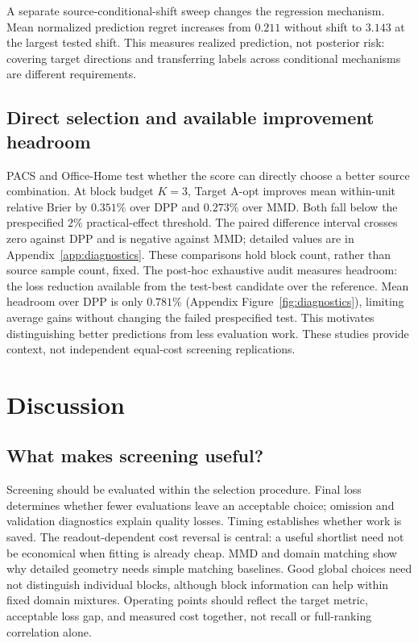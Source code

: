 A separate source-conditional-shift sweep changes the regression mechanism. Mean normalized prediction regret increases from $0.211$ without shift to $3.143$ at the largest tested shift. This measures realized prediction, not posterior risk: covering target directions and transferring labels across conditional mechanisms are different requirements.

\subsection{Direct selection and available improvement headroom}
PACS and Office-Home test whether the score can directly choose a better source combination. At block budget $K=3$, Target A-opt improves mean within-unit relative Brier by $0.351\%$ over DPP and $0.273\%$ over MMD. Both fall below the prespecified $2\%$ practical-effect threshold. The paired difference interval crosses zero against DPP and is negative against MMD; detailed values are in Appendix~\ref{app:diagnostics}. These comparisons hold block count, rather than source sample count, fixed.
The post-hoc exhaustive audit measures headroom: the loss reduction available from the test-best candidate over the reference. Mean headroom over DPP is only $0.781\%$ (Appendix Figure~\ref{fig:diagnostics}), limiting average gains without changing the failed prespecified test. This motivates distinguishing better predictions from less evaluation work. These studies provide context, not independent equal-cost screening replications.

\section{Discussion}
\subsection{What makes screening useful?}
Screening should be evaluated within the selection procedure. Final loss determines whether fewer evaluations leave an acceptable choice; omission and validation diagnostics explain quality losses. Timing establishes whether work is saved. The readout-dependent cost reversal is central: a useful shortlist need not be economical when fitting is already cheap.
MMD and domain matching show why detailed geometry needs simple matching baselines. Good global choices need not distinguish individual blocks, although block information can help within fixed domain mixtures. Operating points should reflect the target metric, acceptable loss gap, and measured cost together, not recall or full-ranking correlation alone.


